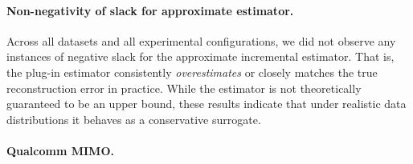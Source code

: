 \documentclass[10pt]{article} %
\begin{document}
\paragraph{Non-negativity of slack for approximate estimator.}
Across all datasets and all experimental configurations, we did not observe any instances of negative slack for the approximate incremental estimator.
That is, the plug-in estimator consistently \emph{overestimates} or closely matches the true reconstruction error in practice.
While the estimator is not theoretically guaranteed to be an upper bound, these results indicate that under realistic data distributions it behaves as a conservative surrogate.

\paragraph{Qualcomm MIMO.}
\end{document}
